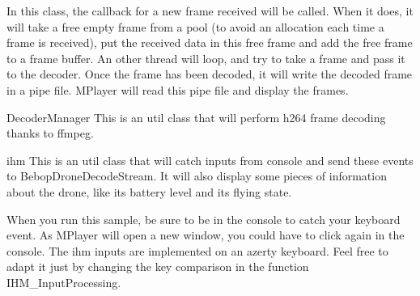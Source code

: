 In this class, the callback for a new frame received will be called. When it does, it will take a free empty frame from a pool (to avoid an allocation each time a frame is received), put the received data in this free frame and add the free frame to a frame buffer. An other thread will loop, and try to take a frame and pass it to the decoder. Once the frame has been decoded, it will write the decoded frame in a pipe file. M\+Player will read this pipe file and display the frames.


\begin{DoxyItemize}
\item Decoder\+Manager This is an util class that will perform h264 frame decoding thanks to ffmpeg.
\item ihm This is an util class that will catch inputs from console and send these events to Bebop\+Drone\+Decode\+Stream. It will also display some pieces of information about the drone, like its battery level and its flying state.
\end{DoxyItemize}

When you run this sample, be sure to be in the console to catch your keyboard event. As M\+Player will open a new window, you could have to click again in the console. The ihm inputs are implemented on an azerty keyboard. Feel free to adapt it just by changing the key comparison in the function I\+H\+M\+\_\+\+Input\+Processing. 